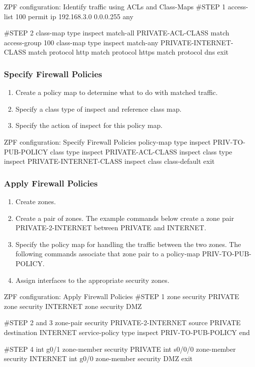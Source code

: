 \begin{sexylisting}{ZPF configuration: Identify traffic using ACLs and Class-Maps}
#STEP 1
access-list 100 permit ip 192.168.3.0 0.0.0.255 any

#STEP 2
class-map type inspect match-all PRIVATE-ACL-CLASS
  match access-group 100    
class-map type inspect match-any PRIVATE-INTERNET-CLASS
  match protocol http
  match protocol https
  match protocol dns
exit    
\end{sexylisting}

\subsubsection{Specify Firewall Policies}

\begin{enumerate}
\item Create a policy map to determine what to do with matched traffic.
\item Specify a class type of inspect and reference class map.
\item Specify the action of inspect for this policy map.
\end{enumerate}

\begin{sexylisting}{ZPF configuration: Specify Firewall Policies}
policy-map type inspect PRIV-TO-PUB-POLICY
  class type inspect PRIVATE-ACL-CLASS   
  inspect    
  class type inspect PRIVATE-INTERNET-CLASS
  inspect
  class class-default
exit  
\end{sexylisting}

\subsubsection{Apply Firewall Policies}

\begin{enumerate}
\item Create zones.
\item Create a pair of zones. The example commands below create a zone pair PRIVATE-2-INTERNET between PRIVATE and INTERNET.
\item Specify the policy map for handling the traffic between the two zones. The following commands associate that zone pair to a policy-map PRIV-TO-PUB-POLICY.
\item Assign interfaces to the appropriate security zones.
\end{enumerate}


\begin{sexylisting}{ZPF configuration: Apply Firewall Policies}
#STEP 1
zone security PRIVATE
zone security INTERNET
zone security DMZ

#STEP 2 and 3
zone-pair security PRIVATE-2-INTERNET source PRIVATE destination INTERNET
  service-policy type inspect  PRIV-TO-PUB-POLICY
end

#STEP 4
int g0/1
  zone-member security PRIVATE
int s0/0/0
  zone-member security INTERNET    
int g0/0
  zone-member security DMZ
exit
\end{sexylisting}


